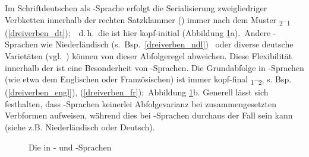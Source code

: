   
  
 \label{Verbabfolgedeutsch} Im Schriftdeutschen als \hai{{\OV}}-Sprache erfolgt die Serialisierung zweigliedriger Verbketten innerhalb der rechten Satzklammer (\hai{{\RSK}}) immer nach dem Muster \textsubscript{2}–\textsubscript{1} (\ref{dreiverben_dt});\, \,%
 d.\,h.\, die  ist hier kopf-initial (Abbildung \ref{kopfxbar}a).\, Andere \hai{{\OV}}-Spra\-chen wie Niederländisch (s.\, Bsp.\,  \ref{dreiverben_ndl}) \,%
 oder diverse deutsche Varietäten (vgl.\, \citealt[75]{Vikner2001})  können von dieser Abfolgeregel abweichen. Diese Flexibilität innerhalb der  ist eine Besonderheit von \hai{{\OV}}-Sprachen. Die Grundabfolge in \hai{{\VO}}-Sprachen (wie etwa dem Englischen oder Französischen) ist immer kopf-final \textsubscript{1}–\textsubscript{2}, s. Bsp. (\ref{dreiverben_engl}), (\ref{dreiverben_fr});\, Abbildung \ref{kopfxbar}b. Generell lässt sich festhalten, dass \hai{{\VO}}-Sprachen keinerlei Abfolgevarianz bei zusammengesetzten Verbformen aufweisen, während dies bei \hai{{\OV}}-Sprachen durchaus der Fall sein kann (siehe z.B. Niederländisch oder Deutsch).

 \begin{figure}[htbp]
 \begin{center}
\caption{Die  in \hai{{\OV}}- und \hai{{\VO}}-Sprachen 
}\label{kopfxbar}
 \end{center}
 \end{figure}

